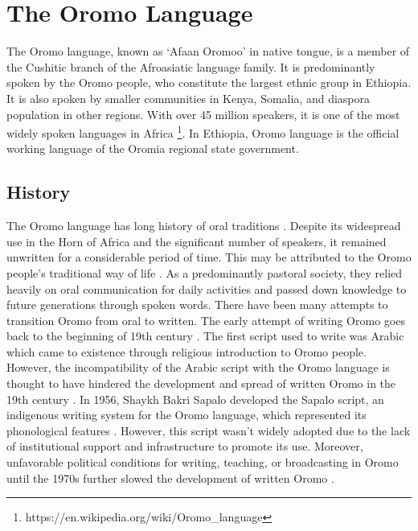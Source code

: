 \documentclass[conference, 9pt]{IEEEtran}
\begin{document}
\section{The Oromo Language}

The Oromo language, known as `Afaan Oromoo' in native tongue, is a member of the Cushitic branch of the Afroasiatic language family\cite{tegegne2016development}. It is predominantly spoken by the Oromo people, who constitute the largest ethnic group in Ethiopia. It is also spoken by smaller communities in Kenya, Somalia, and diaspora population in other regions. With over 45 million speakers, it is one of the most widely spoken languages in Africa \footnote{https://en.wikipedia.org/wiki/Oromo\_language}. In Ethiopia, Oromo language is the official working language of the Oromia regional state government. 

\subsection{History}

The Oromo language has long history of oral traditions \cite{Demie1996HistoricalCI}. Despite its widespread use in the Horn of Africa and the significant number of speakers, it remained unwritten for a considerable period of time. 
This may be attributed to the Oromo people's traditional way of life \cite{OromoOrtho}. As a predominantly pastoral society, they relied heavily on oral communication for daily activities and passed down knowledge to future generations through spoken words.
There have been many attempts to transition Oromo from oral to written. The early attempt of writing Oromo goes back to the beginning of 19th century \cite{tegegne2016development}. The first script used to write was Arabic \cite{Demie1996HistoricalCI} which came to existence through religious introduction to Oromo people. However, the incompatibility of the Arabic script with the Oromo language is thought to have hindered the development and spread of written Oromo in the 19th century \cite{tegegne2016development}. In 1956, Shaykh Bakri Sapalo developed the Sapalo script, an indigenous writing system for the Oromo language, which represented its phonological features \cite{OromoOrtho}. However, this script wasn't widely adopted due to the lack of institutional support and infrastructure to promote its use\cite{OromoOrtho}. Moreover, unfavorable political conditions for writing, teaching, or broadcasting in Oromo until the 1970s further slowed the development of written Oromo \cite{Hassen1994SomeAO}. 
\end{document}
